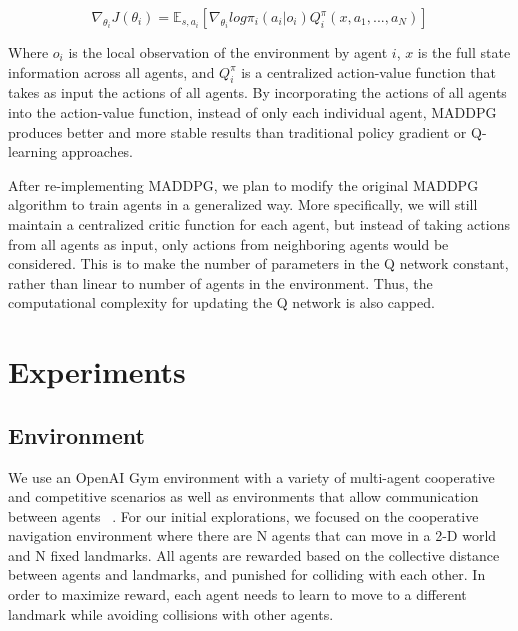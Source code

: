 \documentclass{article}
\begin{document}
$$\nabla_{\theta_i}J(\theta_i) = \mathbb{E}_{s, a_i}[\nabla_{\theta_i}log \pi_i(a_i|o_i)Q^{\pi}_i(x, a_1, ..., a_N)]$$

Where $o_i$ is the local observation of the environment by agent $i$, $x$ is the full state information across all agents, and $Q^{\pi}_i$ is a centralized action-value function that takes as input the actions of all agents. By incorporating the actions of all agents into the action-value function, instead of only each individual agent, MADDPG produces better and more stable results than traditional policy gradient or Q-learning approaches.

After re-implementing MADDPG, we plan to modify the original MADDPG algorithm to train agents in a generalized way. More specifically, we will still maintain a centralized critic function for each agent, but instead of taking actions from all agents as input, only actions from neighboring agents would be considered. This is to make the number of parameters in the Q network constant, rather than linear to number of agents in the environment. Thus, the computational complexity for updating the Q network is also capped.

\section{Experiments}

\subsection{Environment}

We use an OpenAI Gym environment with a variety of multi-agent cooperative and competitive scenarios as well as environments that allow communication between agents ~\cite{openaigym}. For our initial explorations, we focused on the cooperative navigation environment where there are N agents that can move in a 2-D world and N fixed landmarks. All agents are rewarded based on the collective distance between agents and landmarks, and punished for colliding with each other. In order to maximize reward, each agent needs to learn to move to a different landmark while avoiding collisions with other agents.
\end{document}
